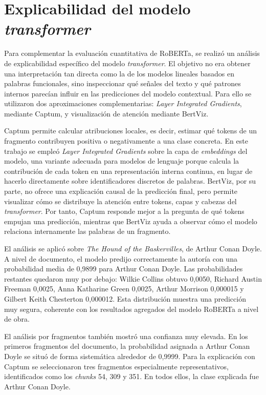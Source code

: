 \documentclass[IB]{TFUOC}%
\begin{document}
\section{Explicabilidad del modelo \textit{transformer}}

Para complementar la evaluación cuantitativa de RoBERTa, se realizó un análisis de explicabilidad específico del modelo \textit{transformer}. El objetivo no era obtener una interpretación tan directa como la de los modelos lineales basados en palabras funcionales, sino inspeccionar qué señales del texto y qué patrones internos parecían influir en las predicciones del modelo contextual. Para ello se utilizaron dos aproximaciones complementarias: \textit{Layer Integrated Gradients}, mediante Captum, y visualización de atención mediante BertViz.

Captum permite calcular atribuciones locales, es decir, estimar qué tokens de un fragmento contribuyen positiva o negativamente a una clase concreta. En este trabajo se empleó \textit{Layer Integrated Gradients} sobre la capa de \textit{embeddings} del modelo, una variante adecuada para modelos de lenguaje porque calcula la contribución de cada token en una representación interna continua, en lugar de hacerlo directamente sobre identificadores discretos de palabras. BertViz, por su parte, no ofrece una explicación causal de la predicción final, pero permite visualizar cómo se distribuye la atención entre tokens, capas y cabezas del \textit{transformer}. Por tanto, Captum responde mejor a la pregunta de qué tokens empujan una predicción, mientras que BertViz ayuda a observar cómo el modelo relaciona internamente las palabras de un fragmento.

El análisis se aplicó sobre \textit{The Hound of the Baskervilles}, de Arthur Conan Doyle. A nivel de documento, el modelo predijo correctamente la autoría con una probabilidad media de 0,9899 para Arthur Conan Doyle. Las probabilidades restantes quedaron muy por debajo: Wilkie Collins obtuvo 0,0050, Richard Austin Freeman 0,0025, Anna Katharine Green 0,0025, Arthur Morrison 0,000015 y Gilbert Keith Chesterton 0,000012. Esta distribución muestra una predicción muy segura, coherente con los resultados agregados del modelo RoBERTa a nivel de obra.

El análisis por fragmentos también mostró una confianza muy elevada. En los primeros fragmentos del documento, la probabilidad asignada a Arthur Conan Doyle se situó de forma sistemática alrededor de 0,9999. Para la explicación con Captum se seleccionaron tres fragmentos especialmente representativos, identificados como los \textit{chunks} 54, 309 y 351. En todos ellos, la clase explicada fue Arthur Conan Doyle.
\end{document}
